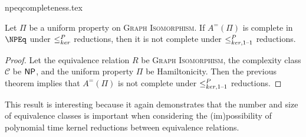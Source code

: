 \begin{filecontents}{npeqcompleteness.tex}
\begin{corollary}\label{cor:inj}
  Let $\Pi$ be a uniform property on \textsc{Graph Isomorphism}.
  If $A^=(\Pi)$ is complete in $\NPEq$ under $\kr$ reductions, then it is not complete under $\kri$ reductions.
\end{corollary}
\begin{proof}
  Let the equivalence relation $R$ be \textsc{Graph Isomorphism}, the complexity class $\mathcal{C}$ be $\NP$, and the uniform property $\Pi$ be Hamiltonicity.
  Then the previous theorem implies that $A^=(\Pi)$ is not complete under $\kri$ reductions.
\end{proof}

This result is interesting because it again demonstrates that the number and size of equivalence classes is important when considering the (im)possibility of polynomial time kernel reductions between equivalence relations.
\end{filecontents}
